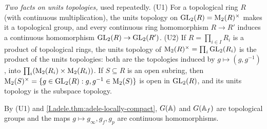 \emph{Two facts on units topologies,} used repeatedly. (U1) For a topological ring $R$ (with continuous
multiplication), the units topology on $\mathrm{GL}_2(R)=\mathrm{M}_2(R)^\times$ makes it a topological group, and every continuous
ring homomorphism $R\to R'$ induces a continuous homomorphism $\mathrm{GL}_2(R)\to\mathrm{GL}_2(R')$. (U2) If $R=\prod_{i\in I}R_i$ is a
product of topological rings, the units topology of $\mathrm{M}_2(R)^\times=\prod_i\mathrm{GL}_2(R_i)$ is the product of the units
topologies: both are the topologies induced by $g\mapsto(g,g^{-1})$, into $\prod_i(\mathrm{M}_2(R_i)\times\mathrm{M}_2(R_i))$. If
$S\subseteq R$ is an open subring, then $\mathrm{M}_2(S)^\times=\{g\in\mathrm{GL}_2(R):g,g^{-1}\in\mathrm{M}_2(S)\}$ is open in $\mathrm{GL}_2(R)$,
and its units topology is the subspace topology.

\begin{definition}[adelic $\GL_2$]
\end{definition}
\noindent By (U1) and \cref{I.adele.thm:adele-locally-compact}, $G(\mathbb{A})$ and $G(\mathbb{A}_f)$ are topological groups and the maps
$g\mapsto g_\infty,g_f,g_p$ are continuous homomorphisms.

